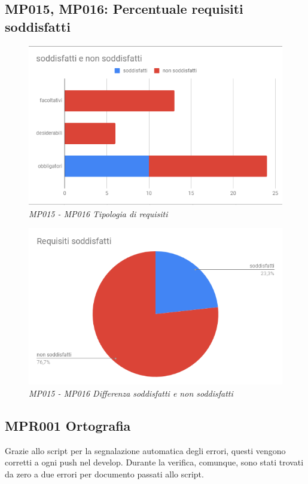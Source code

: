 \subsection{MP015, MP016: Percentuale requisiti soddisfatti}
\begin{figure} [H]
    \centering
	\includegraphics[scale=0.5]{./images/req.PNG}
    \caption{\textit{MP015 - MP016 Tipologia di requisiti}}
\end{figure}
\begin{figure} [H]
    \centering
	\includegraphics[scale=0.5]{./images/RequisitiSoddisfatti.png}
    \caption{\textit{MP015 - MP016 Differenza soddisfatti e non soddisfatti}}
\end{figure}
\subsection{MPR001 Ortografia}
Grazie allo script per la segnalazione automatica degli errori, questi vengono corretti a ogni push nel develop. Durante la verifica, comunque, sono stati trovati da zero a due errori per documento passati allo script. 
